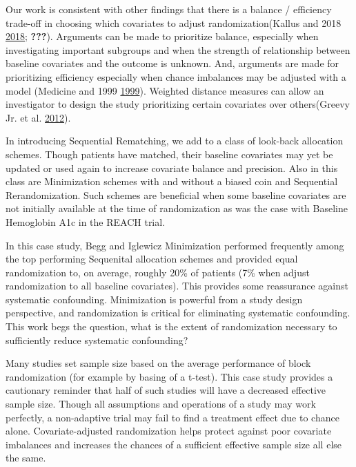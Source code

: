 \documentclass[12pt,oneside]{book}
\newlength{\li}\setlength{\li}{14.48pt}
\newlength{\di}\setlength{\di}{-3.5mm}
\theoremstyle{definition}
\theoremstyle{definition}
\theoremstyle{definition}
\theoremstyle{remark}
\begin{document}
Our work is consistent with other findings that there is a balance /
efficiency trade-off in choosing which covariates to adjust
randomization(Kallus and 2018
\protect\hyperlink{ref-Kallus:2018um}{2018}; {\textbf{???}}). Arguments
can be made to prioritize balance, especially when investigating
important subgroups and when the strength of relationship between
baseline covariates and the outcome is unknown. And, arguments are made
for prioritizing efficiency especially when chance imbalances may be
adjusted with a model (Medicine and 1999
\protect\hyperlink{ref-Atkinson:1999hq}{1999}). Weighted distance
measures can allow an investigator to design the study prioritizing
certain covariates over others(Greevy Jr. et al.
\protect\hyperlink{ref-GreevyJr:2012hp}{2012}).

In introducing Sequential Rematching, we add to a class of look-back
allocation schemes. Though patients have matched, their baseline
covariates may yet be updated or used again to increase covariate
balance and precision. Also in this class are Minimization schemes with
and without a biased coin and Sequential Rerandomization. Such schemes
are beneficial when some baseline covariates are not initially available
at the time of randomization as was the case with Baseline Hemoglobin
A1c in the REACH trial.

In this case study, Begg and Iglewicz Minimization performed frequently
among the top performing Sequenital allocation schemes and provided
equal randomization to, on average, roughly 20\% of patients (7\% when
adjust randomization to all baseline covariates). This provides some
reassurance against systematic confounding. Minimization is powerful
from a study design perspective, and randomization is critical for
eliminating systematic confounding. This work begs the question, what is
the extent of randomization necessary to sufficiently reduce systematic
confounding?

Many studies set sample size based on the average performance of block
randomization (for example by basing of a t-test). This case study
provides a cautionary reminder that half of such studies will have a
decreased effective sample size. Though all assumptions and operations
of a study may work perfectly, a non-adaptive trial may fail to find a
treatment effect due to chance alone. Covariate-adjusted randomization
helps protect against poor covariate imbalances and increases the
chances of a sufficient effective sample size all else the same.
\end{document}
